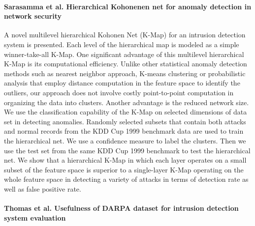 \paragraph*{Sarasamma et al. Hierarchical Kohonenen net for anomaly detection in network security}
\cite{sarasamma2005hierarchical}
A novel multilevel hierarchical Kohonen Net (K-Map) for an intrusion detection system is presented. Each level of the hierarchical map is modeled as a simple winner-take-all K-Map. One significant advantage of this multilevel hierarchical K-Map is its computational efficiency. Unlike other statistical anomaly detection methods such as nearest neighbor approach, K-means clustering or probabilistic analysis that employ distance computation in the feature space to identify the outliers, our approach does not involve costly point-to-point computation in organizing the data into clusters. Another advantage is the reduced network size. We use the classification capability of the K-Map on selected dimensions of data set in detecting anomalies. Randomly selected subsets that contain both attacks and normal records from the KDD Cup 1999 benchmark data are used to train the hierarchical net. We use a confidence measure to label the clusters. Then we use the test set from the same KDD Cup 1999 benchmark to test the hierarchical net. We show that a hierarchical K-Map in which each layer operates on a small subset of the feature space is superior to a single-layer K-Map operating on the whole feature space in detecting a variety of attacks in terms of detection rate as well as false positive rate.

\paragraph*{Thomas et al. Usefulness of DARPA dataset for intrusion detection system evaluation}
\cite{thomas2010usefulness}

